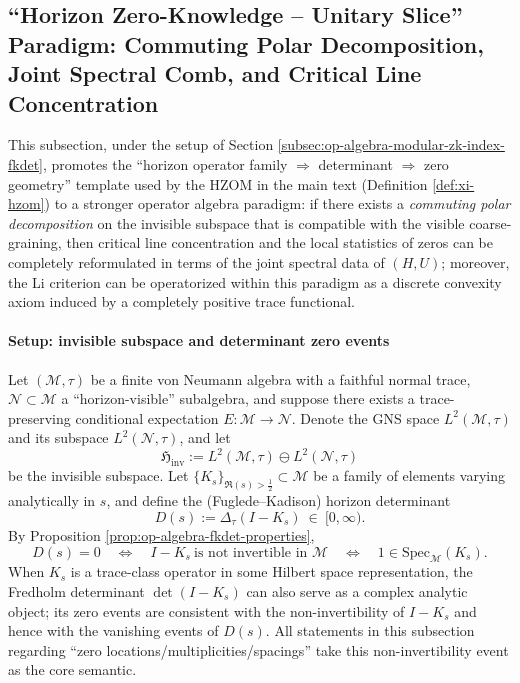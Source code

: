 \subsection{``Horizon Zero-Knowledge -- Unitary Slice'' Paradigm: Commuting Polar Decomposition, Joint Spectral Comb, and Critical Line Concentration}\label{subsec:op-algebra-hzom-unitary-slice-rh}
This subsection, under the setup of Section \ref{subsec:op-algebra-modular-zk-index-fkdet},
promotes the ``horizon operator family \(\Rightarrow\) determinant \(\Rightarrow\) zero geometry'' template used by the HZOM in the main text (Definition \ref{def:xi-hzom})
to a stronger operator algebra paradigm: if there exists a \emph{commuting polar decomposition} on the invisible subspace that is compatible with the visible coarse-graining,
then critical line concentration and the local statistics of zeros can be completely reformulated in terms of the joint spectral data of \((H,U)\);
moreover, the Li criterion can be operatorized within this paradigm as a discrete convexity axiom induced by a completely positive trace functional.

\paragraph{Setup: invisible subspace and determinant zero events}
Let \((\mathcal{M},\tau)\) be a finite von Neumann algebra with a faithful normal trace, \(\mathcal{N}\subset\mathcal{M}\) a ``horizon-visible'' subalgebra,
and suppose there exists a trace-preserving conditional expectation \(E:\mathcal{M}\to\mathcal{N}\).
Denote the GNS space \(L^2(\mathcal{M},\tau)\) and its subspace \(L^2(\mathcal{N},\tau)\), and let
\[
\mathfrak{H}_{\mathrm{inv}}:=L^2(\mathcal{M},\tau)\ominus L^2(\mathcal{N},\tau)
\]
be the invisible subspace.
Let \(\{K_s\}_{\Re(s)>\tfrac12}\subset\mathcal{M}\) be a family of elements varying analytically in \(s\), and define the (Fuglede--Kadison) horizon determinant
\[
D(s):=\Delta_\tau(I-K_s)\ \in\ [0,\infty).
\]
By Proposition \ref{prop:op-algebra-fkdet-properties},
\[
D(s)=0\quad\Longleftrightarrow\quad I-K_s\ \text{is not invertible in }\mathcal{M}
\quad\Longleftrightarrow\quad 1\in \mathrm{Spec}_{\mathcal{M}}(K_s).
\]
When \(K_s\) is a trace-class operator in some Hilbert space representation, the Fredholm determinant \(\det(I-K_s)\) can also serve as a complex analytic object;
its zero events are consistent with the non-invertibility of \(I-K_s\) and hence with the vanishing events of \(D(s)\).
All statements in this subsection regarding ``zero locations/multiplicities/spacings'' take this non-invertibility event as the core semantic.

